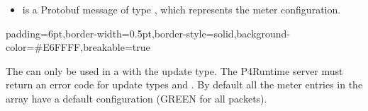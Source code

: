 \documentclass[11pt]{article}
\begin{document}
{\begin{itemize}
\item{}
 is a Protobuf message of type , which represents the
meter configuration.%
\end{itemize}%

\begin{mdbmargintb}{6pt}{6pt}%
\begin{mdblock}{padding=6pt,border-width=0.5pt,border-style=solid,background-color=\#E6FFFF,breakable=true}%
\begin{mdpre}%
\end{mdpre}%
\end{mdblock}%
\end{mdbmargintb}%

\noindent{}The  can only be used in a  with the  update
type.  The P4Runtime server must return an  error code for
update types  and . By default all the meter entries in the
array have a default configuration (GREEN for all packets).%

\begin{itemize}[noitemsep,topsep=\mdcompacttopsep]%


\end{itemize}}
\end{document}
